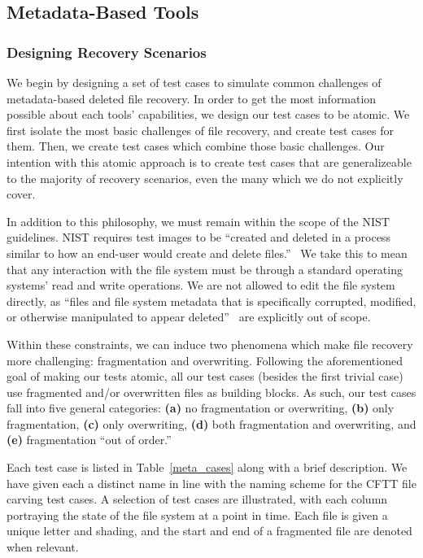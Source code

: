 \subsection{Metadata-Based Tools}
\subsubsection{Designing Recovery Scenarios}

We begin by designing a set of test cases to simulate common challenges of metadata-based deleted file recovery.
In order to get the most information possible about each tools' capabilities, we design our test cases to be atomic.
We first isolate the most basic challenges of file recovery, and create test cases for them.
Then, we create test cases which combine those basic challenges.
Our intention with this atomic approach is to create test cases that are generalizeable to the majority of recovery scenarios, even the many which we do not explicitly cover.

In addition to this philosophy, we must remain within the scope of the NIST guidelines.
NIST requires test images to be ``created and deleted in a process similar to how an end-user would create and delete files.''~\cite{meta:dfr:standards}
We take this to mean that any interaction with the file system must be through a standard operating systems'  read and write operations.
We are not allowed to edit the file system directly, as ``files and file system metadata that is specifically corrupted, modified, or otherwise manipulated to appear deleted''~\cite{meta:dfr:standards} are explicitly out of scope.

Within these constraints, we can induce two phenomena which make file recovery more challenging: fragmentation and overwriting.
Following the aforementioned goal of making our tests atomic, all our test cases (besides the first trivial case) use fragmented and/or overwritten files as building blocks.
As such, our test cases fall into five general categories:
{\bf(a)} no fragmentation or overwriting, 
{\bf (b)} only fragmentation,
{\bf (c)} only overwriting,
{\bf (d)} both fragmentation and overwriting,
and {\bf (e)} fragmentation ``out of order.''


Each test case is listed in Table~\ref{meta_cases} along with a brief description.
We have given each a distinct name in line with the naming scheme for the CFTT file carving test cases.
A selection of test cases are illustrated, with each column portraying the state of the file system at a point in time. 
Each file is given a unique letter and shading, and the start and end of a fragmented file are denoted when relevant.


